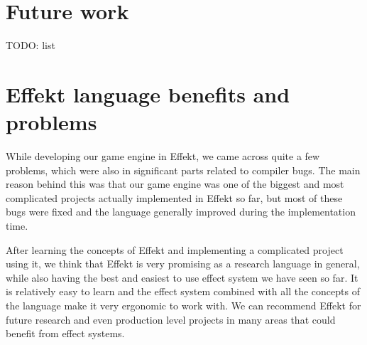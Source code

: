 \section{Future work}

TODO: list

\section{Effekt language benefits and problems}

While developing our game engine in Effekt, we came across quite a few problems, which were also in significant parts related to compiler bugs. The main reason behind this was that our game engine was one of the biggest and most complicated projects actually implemented in Effekt so far, but most of these bugs were fixed and the language generally improved during the implementation time.

After learning the concepts of Effekt and implementing a complicated project using it, we think that Effekt is very promising as a research language in general, while also having the best and easiest to use effect system we have seen so far. It is relatively easy to learn and the effect system combined with all the concepts of the language make it very ergonomic to work with. We can recommend Effekt for future research and even production level projects in many areas that could benefit from effect systems.
